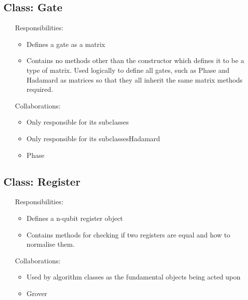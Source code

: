 \documentclass[12pt]{report}
\begin{document}
\subsection{Class: Gate}
\label{sec:Gate}
\begin{itemize}
	\item [Responsibilities:]
	\begin{itemize}
		\item Defines a gate as a matrix
		\item Contains no methods other than the constructor which defines it to be a type of matrix. Used logically to define all gates, such as Phase and Hadamard as matrices so that they all inherit the same matrix methods required.
	\end{itemize}
	\item [Collaborations:]
		\begin{itemize}
		\item Only responsible for its subclasses
		\item Only responsible for its subclassesHadamard
		\item Phase 
	\end{itemize}
\end{itemize}
\subsection{Class: Register}
\label{sec:Register}
\begin{itemize}
	\item [Responsibilities:]
	\begin{itemize}
		\item Defines a n-qubit register object
		\item Contains methods for checking if two registers are equal and how to normalise them.
	\end{itemize}
	\item [Collaborations:]
		\begin{itemize}
		\item Used by algorithm classes as the fundamental objects being acted upon
		\item Grover
	\end{itemize}
\end{itemize}
\end{document}
